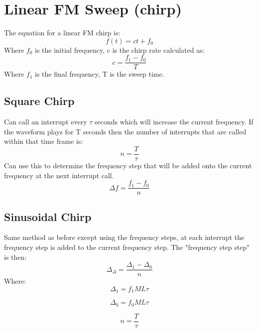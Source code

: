 \documentclass[12pt, a4paper]{article}
\begin{document}
\section{Linear FM Sweep (chirp)}
The equation for a linear FM chirp is:
\begin{equation}
	f(t) = ct + f_0
\end{equation}
Where $f_0$ is the initial frequency, c is the chirp rate calculated as:
\begin{equation}
	c = \frac{f_1 - f_0}{T}
\end{equation}
Where $f_1$ is the final frequency, T is the sweep time. \\
\subsection{Square Chirp}
Can call an interrupt every $\tau$ seconds which will increase the current frequency. If the waveform plays for T seconds then the number of interrupts that are called within that time frame is:
\begin{equation}
	n = \frac{T}{\tau}
\end{equation}
Can use this to determine the frequency step that will be added onto the current frequency at the next interrupt call.
\begin{equation}
	\Delta f = \frac{f_1 - f_0}{n}
\end{equation}
\subsection{Sinusoidal Chirp}
Same method as before except using the frequency steps, at each interrupt the frequency step is added to the current frequency step. The "frequency step step" is then:
\begin{equation}
	\Delta_\Delta = \frac{\Delta_1 - \Delta_0}{n} 
\end{equation}
Where:
\begin{equation*}
	\Delta_1 = f_1ML\tau
\end{equation*}

\begin{equation*}
	\Delta_0 = f_0ML\tau
\end{equation*}

\begin{equation*}
	n = \frac{T}{\tau}
\end{equation*}
\pagebreak
\end{document}
